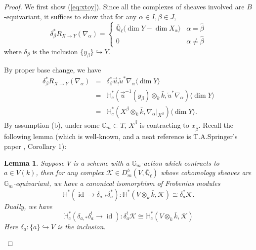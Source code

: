 \documentclass{amsart}
\theoremstyle{plain}
\newtheorem{lemma}[subsubsection]{Lemma}
\theoremstyle{definition}
\theoremstyle{remark}
\numberwithin{equation}{subsection}
\begin{document}
\begin{proof}
We first show (\ref{eq:xtoy}). Since all the complexes of sheaves involved are $B$-equivariant, it suffices to show that for any $\alpha\in I,\beta\in J$,
\begin{equation*}
\delta_{\beta}^*R_{X\to Y}(\nabla_{\alpha})=\left\{\begin{array}{ll} {\overline{\mathbb{Q}}_{\ell}}{\langle{{\dim Y-\dim X_\alpha}}\rangle} & \alpha=\hat{\beta} \\ 0 & \alpha\neq\hat{\beta}\end{array} \right.
\end{equation*}
where $\delta_\beta$ is the inclusion $\{y_\beta\}\hookrightarrow Y$.

By proper base change, we have
\begin{eqnarray*}
\delta_\beta^*R_{X\to Y}(\nabla_\alpha) &=&\delta_\beta^*\overrightarrow{u}_!\overleftarrow{u}^*\nabla_\alpha{\langle{{\dim Y}}\rangle}\\
&=& {\mathbb{H}}^*_c({{\overrightarrow{u}^{-1}(y_\beta)}\otimes_k\bar{k}},\overleftarrow{u}^*\nabla_\alpha){\langle{{\dim Y}}\rangle}\\
&=& {\mathbb{H}}^*_c({{X^{\beta}}\otimes_k\bar{k}},\nabla_\alpha|_{X^{\beta}}){\langle{{\dim Y}}\rangle}.
\end{eqnarray*}
By assumption (b), under some ${\mathbb{G}}_m\subset T$, $X^{\beta}$ is contracting to $x_{\hat{\beta}}$. Recall the following lemma (which is well-known, and a neat reference is T.A.Springer's paper \cite{Sp}, Corollary 1):
\begin{lemma}
Suppose $V$ is a scheme with a ${\mathbb{G}}_m$-action which contracts to $a\in V(k)$, then for any complex ${\mathcal{K}}\in D^b_m(V,{\overline{\mathbb{Q}}_{\ell}})$ whose cohomology sheaves are ${\mathbb{G}}_m$-equivariant, we have a canonical isomorphism of Frobenius modules
\begin{equation}\label{eq:res}
{\mathbb{H}}^*(\operatorname{id}\to\delta_{a,*}\delta_a^{*}):{\mathbb{H}}^*({{V}\otimes_k\bar{k}},{\mathcal{K}})\cong \delta_a^*{\mathcal{K}}.
\end{equation}
Dually, we have
\begin{equation}\label{eq:cores}
{\mathbb{H}}^*_c(\delta_{a,*}\delta_a^{!}\to\operatorname{id}):\delta_a^!{\mathcal{K}}\cong{\mathbb{H}}^*_c({{V}\otimes_k\bar{k}},{\mathcal{K}})
\end{equation}
Here $\delta_a:\{a\}\hookrightarrow V$ is the inclusion.
\end{lemma}


\end{proof}
\end{document}
